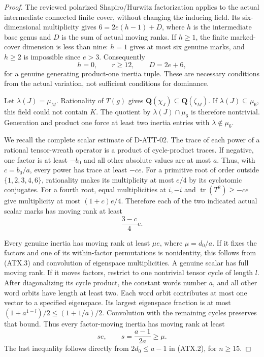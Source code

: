 \begin{proof}
The reviewed polarized Shapiro/Hurwitz factorization applies to
the actual intermediate connected finite cover, without changing
the inducing field.  Its six-dimensional multiplicity gives
$6=2e(h-1)+D$, where $h$ is the intermediate base genus and
$D$ is the sum of actual moving ranks.  If $h\ge1$, the finite
marked-cover dimension is less than nine: $h=1$ gives at most six
genuine marks, and $h\ge2$ is impossible since $e>3$.
Consequently
\[
       h=0,\qquad r\ge12,\qquad D=2e+6,
 \tag{ATX.5}
\]
for a genuine generating product-one inertia tuple.  These are
necessary conditions from the actual variation, not sufficient
conditions for dominance.

Let $\lambda(J)=\mu_M$.  Rationality of $T(g)$ gives
$\mathbf Q(\chi_J)\subseteq\mathbf Q(\zeta_M)$.  If
$\lambda(J)\subseteq\mu_6$, this field could not contain $K$.
The quotient by $\lambda(J)\cap\mu_6$ is therefore nontrivial.
Generation and product one force at least two inertia entries with
$\lambda\notin\mu_6$.

We recall the complete scalar estimate of D-ATT-02.  The trace of
each power of a rational tensor-wreath operator is a product of
cycle-product traces.  If negative, one factor is at least $-b_0$
and all other absolute values are at most $a$.  Thus, with
$c=b_0/a$, every power has trace at least $-ce$.
For a primitive root of order outside $\{1,2,3,4,6\}$, rationality
makes its multiplicity at most $e/4$ by its cyclotomic conjugates.
For a fourth root, equal multiplicities at $i,-i$ and
$\operatorname{tr}(T^2)\ge-ce$ give multiplicity at most
$(1+c)e/4$.  Therefore each of the two indicated actual scalar
marks has moving rank at least
\[
                         \frac{3-c}{4}e.
 \tag{ATX.6}
\]

Every genuine inertia has moving rank at least $\mu e$, where
$\mu=d_0/a$.  If it fixes the factors and one of its within-factor
permutations is nonidentity, this follows from (ATX.3) and convolution of
eigenspace multiplicities.  A genuine scalar has full moving rank.
If it moves factors, restrict to one nontrivial tensor cycle of
length $l$.  After diagonalizing its cycle product, the constant
words number $a$, and all other word orbits have length at least
two.  Each word orbit contributes at most one vector to a specified
eigenspace.  Its largest eigenspace fraction is at most
$(1+a^{1-l})/2\le(1+1/a)/2$.  Convolution with the remaining
cycles preserves that bound.  Thus every factor-moving inertia
has moving rank at least
\[
               s e,\qquad s=\frac{a-1}{2a}\ge\mu.
 \tag{ATX.7}
\]
The last inequality follows directly from $2d_0\le a-1$ in
(ATX.2), for $n\ge15$.


\end{proof}
